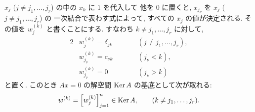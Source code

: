 \documentclass[12pt,twoside]{jarticle}
\begin{document}
$x_j$ ($j\ne j_1,\ldots,j_r$) の中の $x_k$ に $1$ を代入して
他を $0$ に置くと, $x_{j_\nu}$ を $x_j$ ($j\ne j_1,\ldots,j_r$) の
一次結合で表わす式によって, すべての $x_j$ の値が決定される.
その値を $w^{(k)}_j$ と書くことにする.
すなわち $k\ne j_1,\ldots,j_r$ に対して, 
\begin{alignat*}{2}
  &
  w^{(k)}_j = \delta_{jk} & \qquad & (j\ne j_1,\ldots,j_r),
  \\ &
  w^{(k)}_{j_\nu} = c_{\nu k} & \qquad & (j_{\nu}<k),
  \\ &
  w^{(k)}_{j_\nu} = 0 & \qquad & (j_{\nu}>k)
\end{alignat*}
と置く. このとき $Ax=0$ の解空間 $\mathop{\mathrm{Ker}}\nolimits A$ の基底として次が取れる:
\begin{equation*}
  w^{(k)} = \left[ w^{(k)}_j \right]_{j=1}^n \in \mathop{\mathrm{Ker}}\nolimits A,
  \qquad (k\ne j_1,\ldots,j_r).
\end{equation*}

\end{document}
